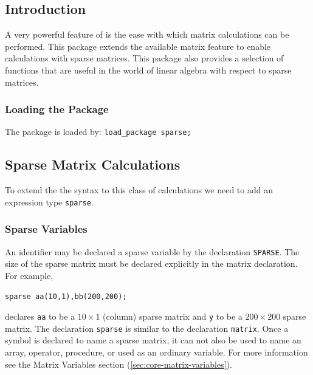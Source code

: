 
\newcommand\sparselineqlist {lin\_eqn$_{1}$,lin\_eqn$_{2}$, \ldots ,lin\_eqn$_{n}$}
\newcommand\sparsematlist   {mat$_{1}$,mat$_{2}$, \ldots ,mat$_{n}$}
\newcommand\sparseveclist   {vec$_{1}$,vec$_{2}$, \ldots ,vec$_{n}$}

\newcommand\sparselazyfootnote{\footnote{The \{\}'s can be omitted.}}


\subsection{Introduction}
\ifdefined{}\fi
A very powerful feature of \REDUCE{} is the ease with which matrix
calculations can be performed.
This package extends the available matrix feature to enable calculations
with sparse matrices. This package also provides a selection of
functions that are useful in the world of linear algebra with respect to
sparse matrices.

\subsubsection*{Loading the Package}
The package is loaded by: \texttt{load\_package sparse;}

\subsection{Sparse Matrix Calculations}
To extend the the syntax to this class of calculations we need to add an
expression type \texttt{sparse}.

\subsubsection{Sparse Variables}
\hypertarget{command:SPARSE}{}
An identifier may be declared a sparse variable by the declaration
\texttt{SPARSE}.
The size of the sparse matrix must be declared explicitly in the matrix
declaration. For example,
\begin{verbatim}
sparse aa(10,1),bb(200,200);
\end{verbatim}
declares \texttt{aa} to be a $10 \times 1$ (column) sparse matrix and \texttt{y} to
be a $200 \times 200$ sparse matrix.
The declaration \texttt{sparse} is similar to the declaration \texttt{matrix}.
Once a symbol is declared to name a sparse matrix, it can not also be
used to name an array, operator, procedure, or used as an ordinary
variable. For more information see the Matrix Variables
section (\ref{sec:core-matrix-variables}).

